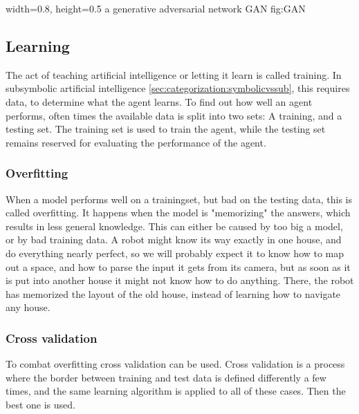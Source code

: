     {width=0.8\textwidth, height=0.5\textheight} %
    {a generative adversarial network}   %
    {GAN}   %
    {fig:GAN}    %

\subsection{Learning}
The act of teaching artificial intelligence or letting it learn is called training. In subsymbolic artificial intelligence \autoref{sec:categorization:symbolicvssub}, this requires data, to determine what the agent learns. To find out how well an agent performs, often times the available data is split into two sets: A training, and a testing set. The training set is used to train the agent, while the testing set remains reserved for evaluating the performance of the agent.

\subsubsection{Overfitting}
\label{sec:overfitting}
When a model performs well on a trainingset, but bad on the testing data, this is called overfitting. It happens when the model is "memorizing" the answers, which results in less general knowledge. This can either be caused by too big a model, or by bad training data\cite{overfit}. A robot might know its way exactly in one house, and do everything nearly perfect, so we will probably expect it to know how to map out a space, and how to parse the input it gets from its camera, but as soon as it is put into another house it might not know how to do anything. There, the robot has memorized the layout of the old house, instead of learning how to navigate any house.

\subsubsection{Cross validation}
To combat overfitting cross validation can be used. Cross validation is a process where the border between training and test data is defined differently a few times, and the same learning algorithm is applied to all of these cases. Then the best one is used.